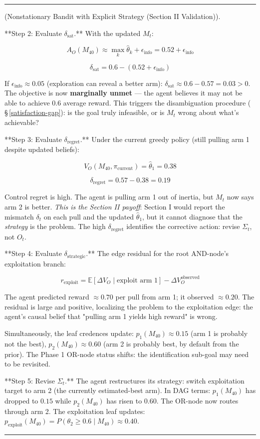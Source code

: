 \documentclass[11pt,oneside]{article}
\newcounter{claim}[section]
\renewcommand{\theclaim}{\thesection.\arabic{claim}}
\newenvironment{segment}[2]{%
  \refstepcounter{claim}%
  \bigskip\noindent\hrule\smallskip
  \noindent{\bfseries #1~\theclaim}\enskip(#2).\par\smallskip
  \noindent\ignorespaces
}{%
  \par\smallskip\noindent\hrule\bigskip
}
\newenvironment{remark}[1][]{\begin{segment}{Remark}{#1}}{\end{segment}}
\begin{document}
\begin{remark}[Nonstationary Bandit with Explicit Strategy (Section II Validation)]
**Step 2: Evaluate $\delta_\text{sat}$.** With the updated $M_t$:

$$A_O(M_{40}) \approx \max_k \hat\theta_k + \epsilon_\text{info} = 0.52 + \epsilon_\text{info}$$

$$\delta_\text{sat} = 0.6 - (0.52 + \epsilon_\text{info})$$

If $\epsilon_\text{info} \approx 0.05$ (exploration can reveal a better arm): $\delta_\text{sat} \approx 0.6 - 0.57 = 0.03 > 0$. The objective is now \textbf{marginally unmet} — the agent believes it may not be able to achieve $0.6$ average reward. This triggers the disambiguation procedure ( \S\,\ref{satisfaction-gap}): is the goal truly infeasible, or is $M_t$ wrong about what's achievable?

**Step 3: Evaluate $\delta_\text{regret}$.** Under the current greedy policy (still pulling arm 1 despite updated beliefs):

$$V_O(M_{40}, \pi_\text{current}) = \hat\theta_1 = 0.38$$

$$\delta_\text{regret} = 0.57 - 0.38 = 0.19$$

Control regret is high. The agent is pulling arm 1 out of inertia, but $M_t$ now says arm 2 is better. \textit{This is the Section II payoff}: Section I would report the mismatch $\delta_t$ on each pull and the updated $\hat\theta_1$, but it cannot diagnose that the \textit{strategy} is the problem. The high $\delta_\text{regret}$ identifies the corrective action: revise $\Sigma_t$, not $O_t$.

**Step 4: Evaluate $\delta_\text{strategic}$.** The edge residual for the root AND-node's exploitation branch:

$$r_\text{exploit} = \mathbb{E}[\Delta V_O \mid \text{exploit arm 1}] - \Delta V_O^\text{observed}$$

The agent predicted reward $\approx 0.70$ per pull from arm 1; it observed $\approx 0.20$. The residual is large and positive, localizing the problem to the exploitation edge: the agent's causal belief that "pulling arm 1 yields high reward" is wrong.

Simultaneously, the leaf credences update: $p_1(M_{40}) \approx 0.15$ (arm 1 is probably not the best), $p_2(M_{40}) \approx 0.60$ (arm 2 is probably best, by default from the prior). The Phase 1 OR-node status shifts: the identification sub-goal may need to be revisited.

**Step 5: Revise $\Sigma_t$.** The agent restructures its strategy: switch exploitation target to arm 2 (the currently estimated-best arm). In DAG terms: $p_1(M_{40})$ has dropped to $0.15$ while $p_2(M_{40})$ has risen to $0.60$. The OR-node now routes through arm 2. The exploitation leaf updates: $p_\text{exploit}(M_{40}) = P(\theta_2 \geq 0.6 \mid M_{40}) \approx 0.40$.


\end{remark}
\end{document}
